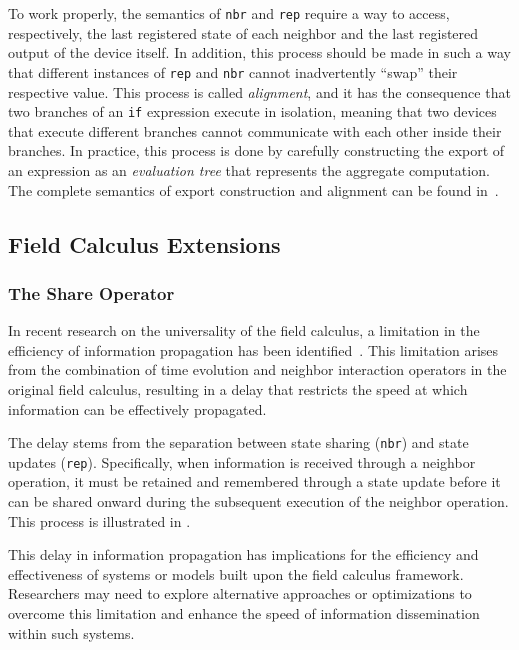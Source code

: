 To work properly, the semantics of \texttt{nbr} and \texttt{rep} require a way to access, respectively, the last registered state of each neighbor and the last registered output of the device itself. In addition, this process should be made in such a way that different instances of \texttt{rep} and \texttt{nbr} cannot inadvertently ``swap'' their respective value. This process is called \textit{alignment}, and it has the consequence that two branches of an \texttt{if} expression execute in isolation, meaning that two devices that execute different branches cannot communicate with each other inside their branches. In practice, this process is done by carefully constructing the export of an expression as an \textit{evaluation tree} that represents the aggregate computation. The complete semantics of export construction and alignment can be found in~\cite{Viroli2018}.

\subsection{Field Calculus Extensions}

\subsubsection{The Share Operator}

In recent research on the universality of the field calculus, a limitation in the efficiency of information propagation has been identified~\cite{Audrito2018}. This limitation arises from the combination of time evolution and neighbor interaction operators in the original field calculus, resulting in a delay that restricts the speed at which information can be effectively propagated.

The delay stems from the separation between state sharing (\texttt{nbr}) and state updates (\texttt{rep}). Specifically, when information is received through a neighbor operation, it must be retained and remembered through a state update before it can be shared onward during the subsequent execution of the neighbor operation. This process is illustrated in .

This delay in information propagation has implications for the efficiency and effectiveness of systems or models built upon the field calculus framework. Researchers may need to explore alternative approaches or optimizations to overcome this limitation and enhance the speed of information dissemination within such systems.


